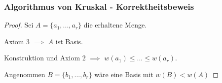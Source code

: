 \begin{frame}
    \frametitle{Algorithmus von Kruskal - Korrektheitsbeweis}
 {
    \begin{proof}
    		\item<1-> Sei $A = \{ a_{1},...,a_{r}\}$ die erhaltene Menge.
    		\item<2-> Axiom 3 $\implies$ $A$ ist Basis.
    		\item<3-> Konstruktion und Axiom 2 $\implies$ $w(a_{1}) \leq ... \leq w(a_{r})$. 
    		\item<4-> Angenommen $B = \{ b_{1},...,b_{r}\}$ wäre eine Basis mit $w(B) < w(A)$
    \end{proof}
}
\end{frame}